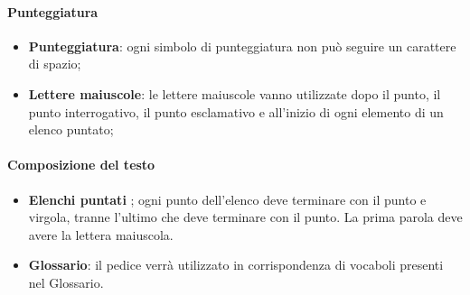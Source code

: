 \paragraph{Punteggiatura}
\begin{itemize}
  \item \textbf{Punteggiatura}: ogni simbolo di punteggiatura non può seguire un 
  carattere di spazio;
  \item \textbf{Lettere maiuscole}: le lettere maiuscole vanno utilizzate dopo il punto, il punto interrogativo, 
  il punto esclamativo e all’inizio di ogni elemento di un elenco puntato;
\end{itemize}
\paragraph{Composizione del testo}
\begin{itemize}
  \item \textbf{Elenchi puntati} ; ogni punto dell’elenco deve terminare con il punto e virgola,
   tranne l’ultimo che deve terminare con il punto. La prima parola deve avere la lettera 
   maiuscola.
   \item \textbf{Glossario}: il pedice verrà utilizzato in corrispondenza di vocaboli presenti nel Glossario.
\end{itemize}
